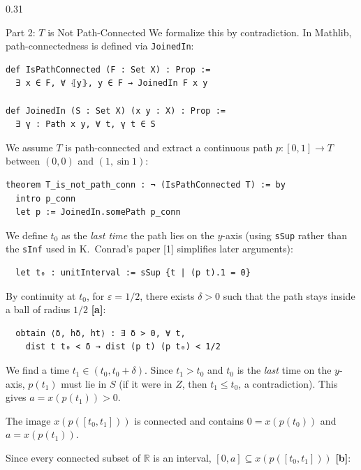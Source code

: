 \documentclass{beamer}
\begin{document}
\begin{frame}[t,fragile]
\begin{columns}[t]
\begin{column}{0.31\textwidth}
\begin{block}{Part 2: $T$ is Not Path-Connected}
                We formalize this by contradiction.
                In Mathlib, path-connectedness is defined via \texttt{JoinedIn}:
                \begin{lstlisting}
def IsPathConnected (F : Set X) : Prop :=
  ∃ x ∈ F, ∀ ⦃y⦄, y ∈ F → JoinedIn F x y

def JoinedIn (S : Set X) (x y : X) : Prop :=
  ∃ γ : Path x y, ∀ t, γ t ∈ S
        \end{lstlisting}

                We assume $T$ is path-connected and extract a continuous path
                $p : [0,1] \to T$ between $(0,0)$ and $(1, \sin 1)$:

                \begin{lstlisting}[language=lean]
theorem T_is_not_path_conn : ¬ (IsPathConnected T) := by
  intro p_conn
  let p := JoinedIn.somePath p_conn
        \end{lstlisting}

                We define $t_0$ as the \textit{last time} the path lies on the $y$-axis
                (using \texttt{sSup} rather than the \texttt{sInf} used in K.\ Conrad's paper [1] simplifies later arguments):
                \begin{lstlisting}
  let t₀ : unitInterval := sSup {t | (p t).1 = 0}
        \end{lstlisting}

                By continuity at $t_0$, for $\varepsilon = 1/2$, there exists $\delta > 0$ such that the path stays inside a ball of radius $1/2$ \textbf{\textcolor{UniBlue}{[a]}}:

                \begin{lstlisting}
  obtain ⟨δ, hδ, ht⟩ : ∃ δ > 0, ∀ t,
    dist t t₀ < δ → dist (p t) (p t₀) < 1/2
        \end{lstlisting}

                We find a time $t_1 \in (t_0, t_0 + \delta)$.
                Since $t_1 > t_0$ and $t_0$ is the \emph{last} time on the $y$-axis,
                $p(t_1)$ must lie in $S$ (if it were in $Z$, then $t_1 \leq t_0$, a contradiction).
                This gives $a = x(p(t_1)) > 0$.

                The image $x(p([t_0, t_1]))$ is connected and contains
                $0 = x(p(t_0))$ and $a = x(p(t_1))$.

                Since every connected subset of $\mathbb{R}$ is an interval,
                $[0, a] \subseteq x(p([t_0, t_1]))$ \textbf{\textcolor{UniBlue}{[b]}}:


\end{block}
\end{column}
\end{columns}
\end{frame}
\end{document}

